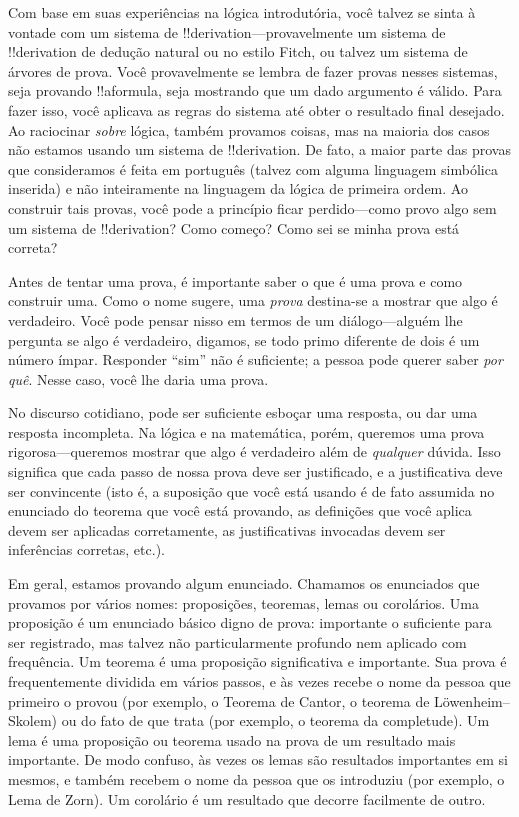 \documentclass[../../../include/open-logic-section]{subfiles}
\begin{document}


Com base em suas experiências na lógica introdutória, você talvez se
sinta à vontade com um sistema de !!{derivation}---provavelmente um
sistema de !!{derivation} de dedução natural ou no estilo Fitch, ou
talvez um sistema de árvores de prova. Você provavelmente se lembra de
fazer provas nesses sistemas, seja provando !!a{formula}, seja
mostrando que um dado argumento é válido. Para fazer isso, você
aplicava as regras do sistema até obter o resultado final desejado. Ao
raciocinar \emph{sobre} lógica, também provamos coisas, mas na maioria
dos casos não estamos usando um sistema de !!{derivation}. De fato, a
maior parte das provas que consideramos é feita em português (talvez
com alguma linguagem simbólica inserida) e não inteiramente na
linguagem da lógica de primeira ordem.  Ao construir tais provas, você
pode a princípio ficar perdido---como provo algo sem um sistema de
!!{derivation}?  Como começo? Como sei se minha prova está correta?

Antes de tentar uma prova, é importante saber o que é uma prova e
como construir uma.  Como o nome sugere, uma \emph{prova} destina-se
a mostrar que algo é verdadeiro. Você pode pensar nisso em termos de um
diálogo---alguém lhe pergunta se algo é verdadeiro, digamos, se todo
primo diferente de dois é um número ímpar. Responder ``sim'' não é
suficiente; a pessoa pode querer saber \emph{por quê}. Nesse caso,
você lhe daria uma prova.

No discurso cotidiano, pode ser suficiente esboçar uma resposta, ou
dar uma resposta incompleta. Na lógica e na matemática, porém,
queremos uma prova rigorosa---queremos mostrar que algo é verdadeiro
além de \emph{qualquer} dúvida. Isso significa que cada passo de nossa
prova deve ser justificado, e a justificativa deve ser convincente
(isto é, a suposição que você está usando é de fato assumida no
enunciado do teorema que você está provando, as definições que você
aplica devem ser aplicadas corretamente, as justificativas invocadas
devem ser inferências corretas, etc.).

Em geral, estamos provando algum enunciado. Chamamos os enunciados que
provamos por vários nomes: proposições, teoremas, lemas ou corolários.
Uma proposição é um enunciado básico digno de prova: importante o
suficiente para ser registrado, mas talvez não particularmente
profundo nem aplicado com frequência. Um teorema é uma proposição
significativa e importante. Sua prova é frequentemente dividida em
vários passos, e às vezes recebe o nome da pessoa que primeiro o provou
(por exemplo, o Teorema de Cantor, o teorema de
L\"owenheim--Skolem) ou do fato de que trata (por exemplo, o teorema da
completude).  Um lema é uma proposição ou teorema usado na prova de um
resultado mais importante. De modo confuso, às vezes os lemas são
resultados importantes em si mesmos, e também recebem o nome da pessoa
que os introduziu (por exemplo, o Lema de Zorn). Um corolário é um
resultado que decorre facilmente de outro.
\end{document}
